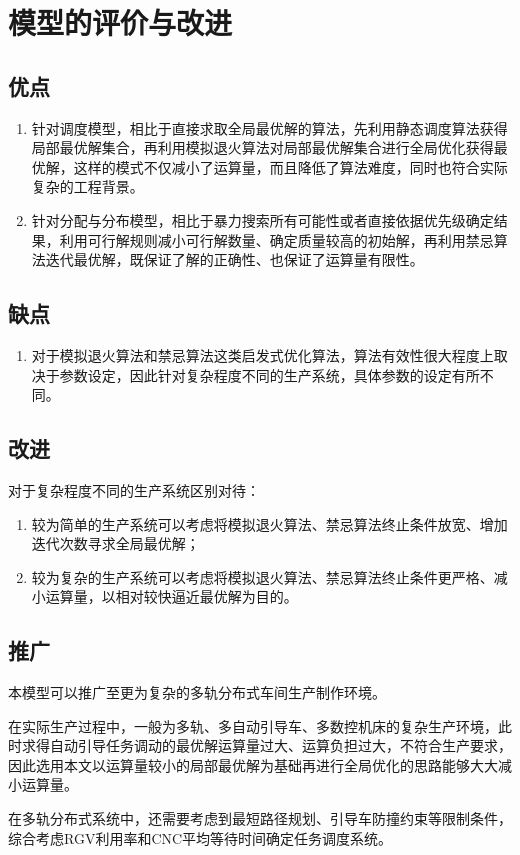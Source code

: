 \section{模型的评价与改进}
	\subsection{优点}
		\begin{enumerate}
			\item 针对调度模型，相比于直接求取全局最优解的算法，先利用静态调度算法获得局部最优解集合，再利用模拟退火算法对局部最优解集合进行全局优化获得最优解，这样的模式不仅减小了运算量，而且降低了算法难度，同时也符合实际复杂的工程背景。
			\item 针对分配与分布模型，相比于暴力搜索所有可能性或者直接依据优先级确定结果，利用可行解规则减小可行解数量、确定质量较高的初始解，再利用禁忌算法迭代最优解，既保证了解的正确性、也保证了运算量有限性。
		\end{enumerate}
	\subsection{缺点}
		\begin{enumerate}
			\item 对于模拟退火算法和禁忌算法这类启发式优化算法，算法有效性很大程度上取决于参数设定，因此针对复杂程度不同的生产系统，具体参数的设定有所不同。
		\end{enumerate}
	\subsection{改进}
		对于复杂程度不同的生产系统区别对待：
		\begin{enumerate}
			\item 较为简单的生产系统可以考虑将模拟退火算法、禁忌算法终止条件放宽、增加迭代次数寻求全局最优解；
			\item 较为复杂的生产系统可以考虑将模拟退火算法、禁忌算法终止条件更严格、减小运算量，以相对较快逼近最优解为目的。
		\end{enumerate}
	\subsection{推广}
		本模型可以推广至更为复杂的多轨分布式车间生产制作环境。
		\par\indent 在实际生产过程中，一般为多轨、多自动引导车、多数控机床的复杂生产环境，此时求得自动引导任务调动的最优解运算量过大、运算负担过大，不符合生产要求，因此选用本文以运算量较小的局部最优解为基础再进行全局优化的思路能够大大减小运算量。
		\par\indent 在多轨分布式系统中，还需要考虑到最短路径规划、引导车防撞约束等限制条件，综合考虑RGV利用率和CNC平均等待时间确定任务调度系统。
